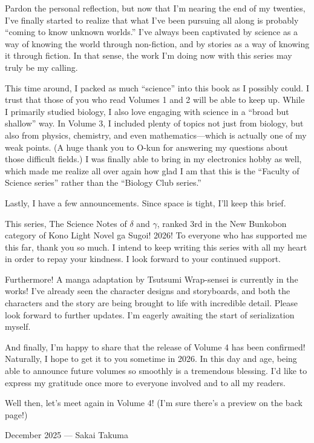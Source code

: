 \documentclass[
    a4paper,
    12pt,
    twoside,
    openany,
    UTF8,
    fontset=windows
]{ctexbook}
\begin{document}
Pardon the personal reflection, but now that I'm nearing the end of my twenties, I've finally started to realize that what I've been pursuing all along is probably ``coming to know unknown worlds.'' I've always been captivated by science as a way of knowing the world through non-fiction, and by stories as a way of knowing it through fiction. In that sense, the work I'm doing now with this series may truly be my calling.

This time around, I packed as much ``science'' into this book as I possibly could. I trust that those of you who read Volumes 1 and 2 will be able to keep up. While I primarily studied biology, I also love engaging with science in a ``broad but shallow'' way. In Volume 3, I included plenty of topics not just from biology, but also from physics, chemistry, and even mathematics---which is actually one of my weak points. (A huge thank you to O-kun for answering my questions about those difficult fields.) I was finally able to bring in my electronics hobby as well, which made me realize all over again how glad I am that this is the ``Faculty of Science series'' rather than the ``Biology Club series.''

Lastly, I have a few announcements. Since space is tight, I'll keep this brief.

This series, The Science Notes of $\delta$ and $\gamma$, ranked 3rd in the New Bunkobon category of Kono Light Novel ga Sugoi! 2026! To everyone who has supported me this far, thank you so much. I intend to keep writing this series with all my heart in order to repay your kindness. I look forward to your continued support.

Furthermore! A manga adaptation by Tsutsumi Wrap-sensei is currently in the works! I've already seen the character designs and storyboards, and both the characters and the story are being brought to life with incredible detail. Please look forward to further updates. I'm eagerly awaiting the start of serialization myself.

And finally, I'm happy to share that the release of Volume 4 has been confirmed! Naturally, I hope to get it to you sometime in 2026. In this day and age, being able to announce future volumes so smoothly is a tremendous blessing. I'd like to express my gratitude once more to everyone involved and to all my readers.

Well then, let's meet again in Volume 4! (I'm sure there's a preview on the back page!)

\begin{flushright}
December 2025 --- Sakai Takuma
\end{flushright}
\end{document}
